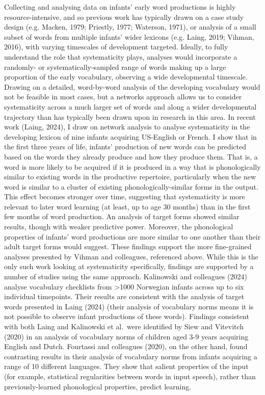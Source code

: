 \documentclass[
  man]{apa6}
\begin{document}
Collecting and analysing data on infants' early word productions is highly resource-intensive, and so previous work has typically drawn on a case study design (e.g. Macken, 1979; Priestly, 1977; Waterson, 1971), or analysis of a small subset of words from multiple infants' wider lexicons (e.g. Laing, 2019; Vihman, 2016), with varying timescales of development targeted. Ideally, to fully understand the role that systematicity plays, analyses would incorporate a randomly- or systematically-sampled range of words making up a large proportion of the early vocabulary, observing a wide developmental timescale. Drawing on a detailed, word-by-word analysis of the developing vocabulary would not be feasible in most cases, but a networks approach allows us to consider systematicity across a much larger set of words and along a wider developmental trajectory than has typically been drawn upon in research in this area. In recent work (Laing, 2024), I draw on network analysis to analyse systematicity in the developing lexicon of nine infants acquiring US-English or French. I show that in the first three years of life, infants' production of new words can be predicted based on the words they already produce and how they produce them. That is, a word is more likely to be acquired if it is produced in a way that is phonologically similar to existing words in the productive repertoire, particularly when the new word is similar to a cluster of existing phonologically-similar forms in the output. This effect becomes stronger over time, suggesting that systematicity is more relevant to later word learning (at least, up to age 30 months) than in the first few months of word production. An analysis of target forms showed similar results, though with weaker predictive power. Moreover, the phonological properties of infants' word productions are more similar to one another than their adult target forms would suggest. These findings support the more fine-grained analyses presented by Vihman and colleagues, referenced above. While this is the only such work looking at systematicity specifically, findings are supported by a number of studies using the same approach. Kalinowski and colleagues (2024) analyse vocabulary checklists from \textgreater1000 Norwegian infants across up to six individual timepoints. Their results are consistent with the analysis of target words presented in Laing (2024) (their analysis of vocabulary norms means it is not possible to observe infant productions of these words). Findings consistent with both Laing and Kalinowski et al.~were identified by Siew and Vitevitch (2020) in an analysis of vocabulary norms of children aged 3-9 years acquiring English and Dutch. Fourtassi and colleagues (2020), on the other hand, found contrasting results in their analysis of vocabulary norms from infants acquiring a range of 10 different languages. They show that salient properties of the input (for example, statistical regularities between words in input speech), rather than previously-learned phonological properties, predict learning.
\end{document}
